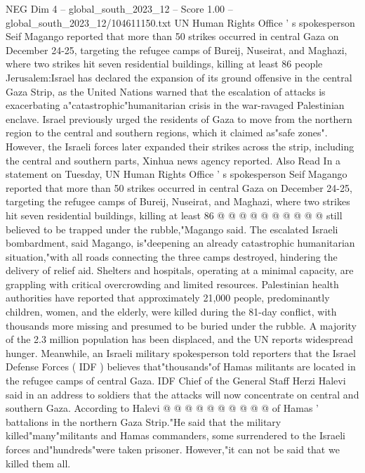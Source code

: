 \begin{textsample}{NEG Dim 4 – global\_south\_2023\_12 – Score 1.00 – global\_south\_2023\_12/104611150.txt}  \label{ex:f4_neg_328}
UN Human Rights Office ' s spokesperson Seif Magango reported that more than 50 strikes occurred in central Gaza on December 24-25, targeting the refugee camps of Bureij, Nuseirat, and Maghazi, where two strikes hit seven residential buildings, killing at least 86 people Jerusalem:Israel has declared the expansion of its ground offensive in the central Gaza Strip, as the United Nations warned that the escalation of attacks is exacerbating a"catastrophic"humanitarian crisis in the war-ravaged Palestinian enclave.
Israel previously urged the residents of Gaza to move from the northern region to the central and southern regions, which it claimed as"safe zones".
However, the Israeli forces later expanded their strikes across the strip, including the central and southern parts, Xinhua news agency reported.
Also Read In a statement on Tuesday, UN Human Rights Office ' s spokesperson Seif Magango reported that more than 50 strikes occurred in central Gaza on December 24-25, targeting the refugee camps of Bureij, Nuseirat, and Maghazi, where two strikes hit seven residential buildings, killing at least 86 @ @ @ @ @ @ @ @ @ @ still believed to be trapped under the rubble,"Magango said.
The escalated Israeli bombardment, said Magango, is"deepening an already catastrophic humanitarian situation,"with all roads connecting the three camps destroyed, hindering the delivery of relief aid.
Shelters and hospitals, operating at a minimal capacity, are grappling with critical overcrowding and limited resources.
Palestinian health authorities have reported that approximately 21,000 people, predominantly children, women, and the elderly, were killed during the 81-day conflict, with thousands more missing and presumed to be buried under the rubble.
A majority of the 2.3 million population has been displaced, and the UN reports widespread hunger.
Meanwhile, an Israeli military spokesperson told reporters that the Israel Defense Forces ( IDF ) believes that"thousands"of Hamas militants are located in the refugee camps of central Gaza.
IDF Chief of the General Staff Herzi Halevi said in an address to soldiers that the attacks will now concentrate on central and southern Gaza.
According to Halevi @ @ @ @ @ @ @ @ @ @ of Hamas ' battalions in the northern Gaza Strip."He said that the military killed"many"militants and Hamas commanders, some surrendered to the Israeli forces and"hundreds"were taken prisoner.
However,"it can not be said that we killed them all.

\end{textsample}
